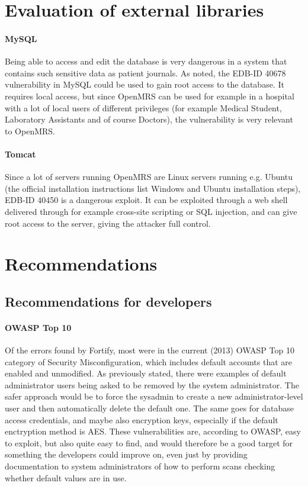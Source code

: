 \documentclass{report} %
\begin{document}
\section{Evaluation of external libraries}
\paragraph{MySQL}
Being able to access and edit the database is very dangerous in a system that
contains such sensitive data as patient journals.
As noted, the EDB-ID 40678 vulnerability in MySQL could be used to gain root
access to the database. It requires local access, but since OpenMRS can be used
for example in a hospital with a lot of local users of different privileges (for
example Medical Student, Laboratory Assistants and of course Doctors), the
vulnerability is very relevant to OpenMRS. 

\paragraph{Tomcat}
Since a lot of servers running OpenMRS are Linux servers running e.g. Ubuntu
(the official installation instructions list Windows and Ubuntu installation
steps), EDB-ID 40450 is a dangerous exploit. It can be exploited through a web
shell delivered through for example cross-site scripting or SQL injection, and
can give root access to the server, giving the attacker full control.

\section{Recommendations}

\subsection{Recommendations for developers}

\paragraph{OWASP Top 10}
Of the errors found by Fortify, most were in the current (2013) OWASP Top 10
category of Security Misconfiguration, which includes default accounts that are
enabled and unmodified. As previously stated, there were examples of default
administrator users being asked to be removed by the system administrator. The
safer approach would be to force the sysadmin to create a new
administrator-level user and then automatically delete the default one. The same
goes for database access credentials, and maybe also encryption keys, especially
if the default enctryption method is AES. These vulnerabilities are, according to OWASP,
easy to exploit, but also quite easy to find, and would therefore be a good
target for something the developers could improve on, even just by providing
documentation to system administrators of how to perform scans checking whether
default values are in use.
\end{document}
